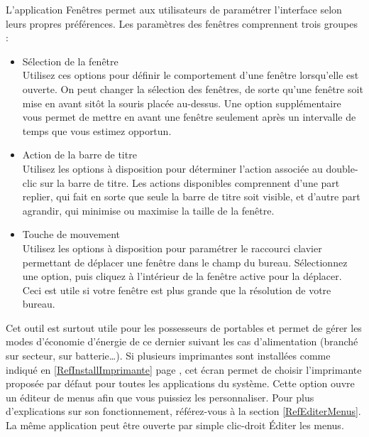 L'application Fenêtres permet aux utilisateurs de paramétrer l'interface selon leurs propres préférences. Les paramètres des fenêtres comprennent trois groupes : 
\begin{itemize}
\item Sélection de la fenêtre\\
Utilisez ces options pour définir le comportement d'une fenêtre lorsqu'elle est ouverte. On peut changer la sélection des fenêtres, de sorte qu'une fenêtre soit mise en avant sitôt la souris placée au-dessus. Une option supplémentaire vous permet de mettre en avant une fenêtre seulement après un intervalle de temps que vous estimez opportun. 
\item Action de la barre de titre\\
Utilisez les options à disposition pour déterminer l'action associée au double-clic sur la barre de titre. Les actions disponibles comprennent d'une part replier, qui fait en sorte que seule la barre de titre soit visible, et d'autre part agrandir, qui minimise ou maximise la taille de la fenêtre. 
\item Touche de mouvement\\
Utilisez les options à disposition pour paramétrer le raccourci clavier permettant de déplacer une fenêtre dans le champ du bureau. Sélectionnez une option, puis cliquez à l'intérieur de la fenêtre active pour la déplacer. Ceci est utile si votre fenêtre est plus grande que la résolution de votre bureau. 
\end{itemize}
Cet outil est surtout utile pour les possesseurs de portables et permet de gérer les modes d'économie d'énergie de ce dernier suivant les cas d'alimentation (branché sur secteur, sur batterie\ldots{}).
Si plusieurs imprimantes sont installées comme indiqué en \ref{RefInstallImprimante} page \pageref{RefInstallImprimante}, cet écran permet de choisir l'imprimante proposée par défaut pour toutes les applications du système.
Cette option ouvre un éditeur de menus afin que vous puissiez les personnaliser. Pour plus d'explications sur son fonctionnement, référez-vous à la section \ref{RefEditerMenus}. La même application peut être ouverte par simple clic-droit \FlecheDroite Éditer les menus.
